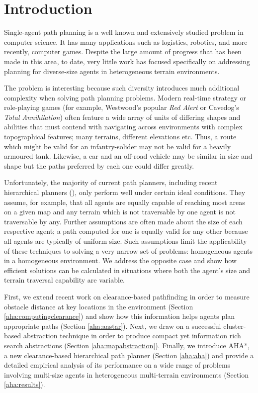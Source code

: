 \section{Introduction}
Single-agent path planning is a well known and extensively studied problem in computer science.
It has many applications such as logistics, robotics, and more recently, computer games. 
Despite the large amount of progress that has been made in this area, to date, very little work has focused specifically on addressing planning for diverse-size agents in heterogeneous terrain environments. 
\par \indent
The problem is interesting because such diversity introduces much additional complexity when solving path planning problems.
Modern real-time strategy or role-playing games (for example, Westwood's popular \emph{Red Alert} or Cavedog's \emph{Total Annihilation}) often feature a wide array of units of differing shapes and abilities that must contend with navigating across environments with complex topographical features; many terrains, different elevations etc. 
Thus, a route which might be valid for an infantry-solider may not be valid for a heavily armoured tank. 
Likewise, a car and an off-road vehicle may be similar in size and shape but the paths preferred by each one could differ greatly. 
\par \indent
Unfortunately, the majority of current path planners, including recent hierarchical planners (\cite{botea04,sturtevant05,demyen07,geraerts07}), only perform well under certain ideal conditions. 
They assume, for example, that all agents are equally capable of reaching most areas on a given map and any terrain which is not traversable by one agent is not traversable by any. 
Further assumptions are often made about the size of each respective agent; a path computed for one is equally valid for any other because all agents are typically of uniform size. 
Such assumptions limit the applicability of these techniques to solving a very narrow set of problems: homogeneous agents in a homogeneous environment. 
We address the opposite case and show how efficient solutions can be calculated in situations where both the agent's size and terrain traversal capability are variable. 
\par \indent
First, we extend recent work on clearance-based pathfinding \cite{geraerts07} in order to measure obstacle distance at key locations in the environment (Section \ref{aha:computingclearance}) and show how this information helps agents plan appropriate paths (Section \ref{aha:aastar}). 
Next, we draw on a successful cluster-based abstraction technique \cite{botea04} in order to produce compact yet information rich search abstractions (Section \ref{aha:mapabstraction}). 
Finally, we introduce AHA*, a new clearance-based hierarchical path planner (Section \ref{aha:aha}) and provide a detailed empirical analysis of its performance on a wide range of problems involving multi-size agents in heterogeneous multi-terrain environments (Section \ref{aha:results}).
